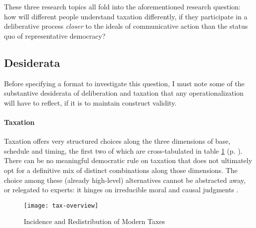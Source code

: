 
These three research topics all fold into the aforementioned research question: how will different people understand taxation differently, if they participate in a deliberative process \emph{closer} to the ideals of communicative action than the status quo of representative democracy?

\subsection{Desiderata}
Before specifying a format to investigate this question, I must note some of the substantive desiderata of deliberation and taxation that any operationalization will have to reflect, if it is to maintain construct validity.

\paragraph{Taxation}
Taxation offers very structured choices along the three dimensions of base, schedule and timing, the first two of which are cross-tabulated in table \ref{tab:tax-overview} (p. \pageref{tab:tax-overview}).
There can be no meaningful democratic rule on taxation that does not ultimately opt for a definitive mix of distinct combinations along those dimensions. 
The choice among these (already high-level) alternatives cannot be abstracted away, or relegated to experts: it hinges on irreducible moral and causal judgments \citep[for example, ][]{McCaffery2005}.

\begin{landscape}
 \begin{figure}[htbp]
    \begin{center}
	\texttt{[image: tax-overview]}  
	\caption{Incidence and Redistribution of Modern Taxes}
	\label{tab:tax-overview}
	\end{center}
	
\end{figure}
\end{landscape} %

